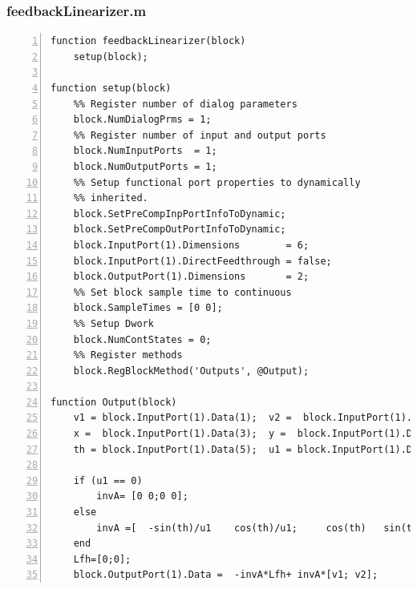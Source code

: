 \documentclass[11pt, a4paper, oneside, openany, reqno]{book}
\theoremstyle{definition}
\theoremstyle{remark}
\numberwithin{equation}{chapter} %
\begin{document}
\subsubsection{feedbackLinearizer.m}
\begin{footnotesize}
\begin{Verbatim}[fontfamily=cmtt,baselinestretch=0,numbers=left]
function feedbackLinearizer(block)
    setup(block);

function setup(block)
    %% Register number of dialog parameters   
    block.NumDialogPrms = 1;
    %% Register number of input and output ports
    block.NumInputPorts  = 1;
    block.NumOutputPorts = 1;
    %% Setup functional port properties to dynamically
    %% inherited.
    block.SetPreCompInpPortInfoToDynamic;
    block.SetPreCompOutPortInfoToDynamic; 
    block.InputPort(1).Dimensions        = 6;
    block.InputPort(1).DirectFeedthrough = false;  
    block.OutputPort(1).Dimensions       = 2;  
    %% Set block sample time to continuous
    block.SampleTimes = [0 0];  
    %% Setup Dwork
    block.NumContStates = 0;
    %% Register methods
    block.RegBlockMethod('Outputs', @Output);  

function Output(block)
    v1 = block.InputPort(1).Data(1);  v2 =  block.InputPort(1).Data(2);
    x =  block.InputPort(1).Data(3);  y =  block.InputPort(1).Data(4);
    th = block.InputPort(1).Data(5);  u1 = block.InputPort(1).Data(6);

    if (u1 == 0)
        invA= [0 0;0 0];
    else
        invA =[  -sin(th)/u1    cos(th)/u1;     cos(th)   sin(th)];
    end
    Lfh=[0;0];  
    block.OutputPort(1).Data =  -invA*Lfh+ invA*[v1; v2];
\end{Verbatim}
\end{footnotesize}
\end{document}
